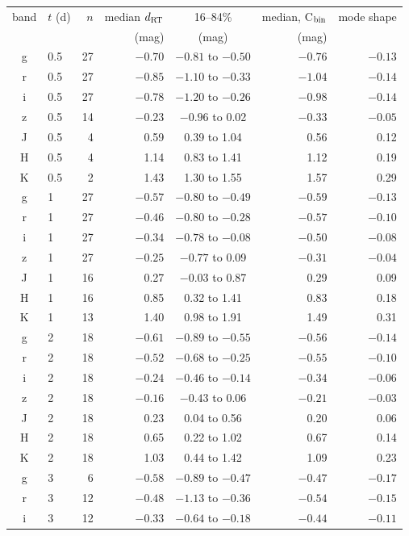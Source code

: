 \begin{tabular}{clrrcrr}
\toprule
band & $t$ (d) & $n$ & median $d_{\rm RT}$ & 16--84\% & median, C$_{\rm bin}$ & mode shape \\
 & & & (mag) & (mag) & (mag) &  \\
\midrule
g & 0.5 & 27 & $-0.70$ & $-0.81$ to $-0.50$ & $-0.76$ & $-0.13$ \\
r & 0.5 & 27 & $-0.85$ & $-1.10$ to $-0.33$ & $-1.04$ & $-0.14$ \\
i & 0.5 & 27 & $-0.78$ & $-1.20$ to $-0.26$ & $-0.98$ & $-0.14$ \\
z & 0.5 & 14 & $-0.23$ & $-0.96$ to 0.02 & $-0.33$ & $-0.05$ \\
J & 0.5 & 4 & 0.59 & 0.39 to 1.04 & 0.56 & 0.12 \\
H & 0.5 & 4 & 1.14 & 0.83 to 1.41 & 1.12 & 0.19 \\
K & 0.5 & 2 & 1.43 & 1.30 to 1.55 & 1.57 & 0.29 \\
g & 1 & 27 & $-0.57$ & $-0.80$ to $-0.49$ & $-0.59$ & $-0.13$ \\
r & 1 & 27 & $-0.46$ & $-0.80$ to $-0.28$ & $-0.57$ & $-0.10$ \\
i & 1 & 27 & $-0.34$ & $-0.78$ to $-0.08$ & $-0.50$ & $-0.08$ \\
z & 1 & 27 & $-0.25$ & $-0.77$ to 0.09 & $-0.31$ & $-0.04$ \\
J & 1 & 16 & 0.27 & $-0.03$ to 0.87 & 0.29 & 0.09 \\
H & 1 & 16 & 0.85 & 0.32 to 1.41 & 0.83 & 0.18 \\
K & 1 & 13 & 1.40 & 0.98 to 1.91 & 1.49 & 0.31 \\
g & 2 & 18 & $-0.61$ & $-0.89$ to $-0.55$ & $-0.56$ & $-0.14$ \\
r & 2 & 18 & $-0.52$ & $-0.68$ to $-0.25$ & $-0.55$ & $-0.10$ \\
i & 2 & 18 & $-0.24$ & $-0.46$ to $-0.14$ & $-0.34$ & $-0.06$ \\
z & 2 & 18 & $-0.16$ & $-0.43$ to 0.06 & $-0.21$ & $-0.03$ \\
J & 2 & 18 & 0.23 & 0.04 to 0.56 & 0.20 & 0.06 \\
H & 2 & 18 & 0.65 & 0.22 to 1.02 & 0.67 & 0.14 \\
K & 2 & 18 & 1.03 & 0.44 to 1.42 & 1.09 & 0.23 \\
g & 3 & 6 & $-0.58$ & $-0.89$ to $-0.47$ & $-0.47$ & $-0.17$ \\
r & 3 & 12 & $-0.48$ & $-1.13$ to $-0.36$ & $-0.54$ & $-0.15$ \\
i & 3 & 12 & $-0.33$ & $-0.64$ to $-0.18$ & $-0.44$ & $-0.11$ \\

\end{tabular}
